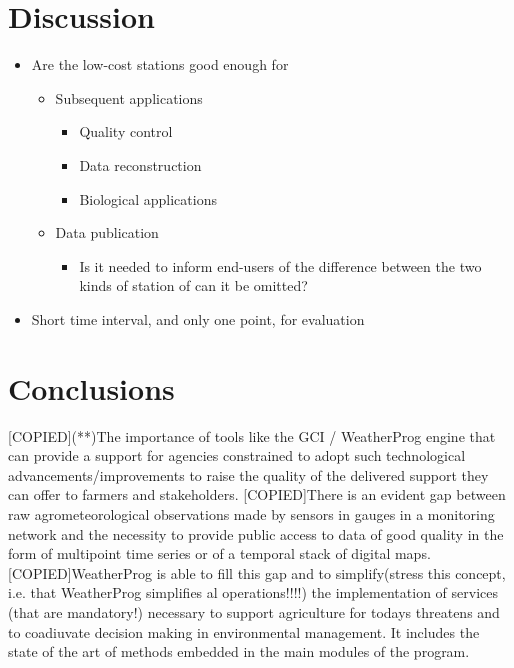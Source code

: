 \documentclass[authoryear,preprint,review,12pt]{elsarticle}
\begin{document}
\section{Discussion}
\begin{itemize}
    \item Are the low-cost stations good enough for
    \begin{itemize}
        \item Subsequent applications
        \begin{itemize}
            \item Quality control
            \item Data reconstruction
            \item Biological applications
        \end{itemize}
        \item Data publication
        \begin{itemize}
            \item Is it needed to inform end-users of the difference between the two kinds of station of can it be omitted?
        \end{itemize}
    \end{itemize}
    \item Short time interval, and only one point, for evaluation
\end{itemize}

\section{Conclusions}
[COPIED](**)The importance of tools like the GCI / WeatherProg engine that can provide a support for agencies constrained to adopt such technological advancements/improvements to raise the quality of the delivered support they can offer to farmers and stakeholders.
[COPIED]There is an evident gap between raw agrometeorological observations made by sensors in gauges in a monitoring network and the necessity to provide public access to data of good quality in the form of multipoint time series or of a temporal stack of digital maps.
[COPIED]WeatherProg is able to fill this gap and to simplify(stress this concept, i.e. that WeatherProg simplifies al operations!!!!) the implementation of services (that are mandatory!) necessary to support agriculture for todays threatens and to coadiuvate decision making in environmental management. It includes the state of the art of methods embedded in the main modules of the program.
\end{document}
